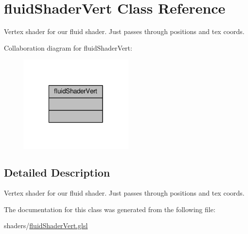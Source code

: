 \hypertarget{classfluid_shader_vert}{\section{fluid\-Shader\-Vert Class Reference}
\label{classfluid_shader_vert}
}


Vertex shader for our fluid shader. Just passes through positions and tex coords.  




Collaboration diagram for fluid\-Shader\-Vert\-:\nopagebreak
\begin{figure}[H]
\begin{center}
\leavevmode
\includegraphics[width=162pt]{classfluid_shader_vert__coll__graph}
\end{center}
\end{figure}


\subsection{Detailed Description}
Vertex shader for our fluid shader. Just passes through positions and tex coords. 

The documentation for this class was generated from the following file\-:\begin{DoxyCompactItemize}
\item 
shaders/\hyperlink{fluid_shader_vert_8glsl}{fluid\-Shader\-Vert.\-glsl}\end{DoxyCompactItemize}
